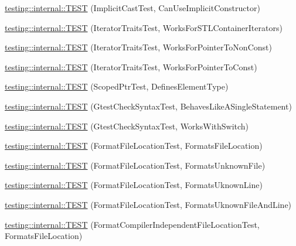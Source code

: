 \begin{DoxyCompactItemize}
\item 
\mbox{\hyperlink{namespacetesting_1_1internal_ad5c2cf37cc5aa78744012255cae78f9b}{testing\+::internal\+::\+T\+E\+ST}} (Implicit\+Cast\+Test, Can\+Use\+Implicit\+Constructor)
\item 
\mbox{\hyperlink{namespacetesting_1_1internal_abd56ca990c5b8c1aea44d15028a74f33}{testing\+::internal\+::\+T\+E\+ST}} (Iterator\+Traits\+Test, Works\+For\+S\+T\+L\+Container\+Iterators)
\item 
\mbox{\hyperlink{namespacetesting_1_1internal_a642234d85836450bb8795cf0a8a9f908}{testing\+::internal\+::\+T\+E\+ST}} (Iterator\+Traits\+Test, Works\+For\+Pointer\+To\+Non\+Const)
\item 
\mbox{\hyperlink{namespacetesting_1_1internal_afc0e95a0472d243967fd4720c681c478}{testing\+::internal\+::\+T\+E\+ST}} (Iterator\+Traits\+Test, Works\+For\+Pointer\+To\+Const)
\item 
\mbox{\hyperlink{namespacetesting_1_1internal_a99f56e2e9d5b30a879f877cc72bb0c0c}{testing\+::internal\+::\+T\+E\+ST}} (Scoped\+Ptr\+Test, Defines\+Element\+Type)
\item 
\mbox{\hyperlink{namespacetesting_1_1internal_a26d00130a017a66d0d60dc5a02a13d25}{testing\+::internal\+::\+T\+E\+ST}} (Gtest\+Check\+Syntax\+Test, Behaves\+Like\+A\+Single\+Statement)
\item 
\mbox{\hyperlink{namespacetesting_1_1internal_a4dfd147ff396984fca799878cb53dcea}{testing\+::internal\+::\+T\+E\+ST}} (Gtest\+Check\+Syntax\+Test, Works\+With\+Switch)
\item 
\mbox{\hyperlink{namespacetesting_1_1internal_a1a1c20d78e9e75b9c7f2b767eb62611b}{testing\+::internal\+::\+T\+E\+ST}} (Format\+File\+Location\+Test, Formats\+File\+Location)
\item 
\mbox{\hyperlink{namespacetesting_1_1internal_ace2f5407afdfb0767035d44b6758e4a0}{testing\+::internal\+::\+T\+E\+ST}} (Format\+File\+Location\+Test, Formats\+Unknown\+File)
\item 
\mbox{\hyperlink{namespacetesting_1_1internal_a17d1f472b6c1154de7b5b008b964ee32}{testing\+::internal\+::\+T\+E\+ST}} (Format\+File\+Location\+Test, Formats\+Uknown\+Line)
\item 
\mbox{\hyperlink{namespacetesting_1_1internal_a1195aaf7258c5442de7aebd95acefb9f}{testing\+::internal\+::\+T\+E\+ST}} (Format\+File\+Location\+Test, Formats\+Uknown\+File\+And\+Line)
\item 
\mbox{\hyperlink{namespacetesting_1_1internal_a9c12f8c1ebb19906e8fa0c430d139076}{testing\+::internal\+::\+T\+E\+ST}} (Format\+Compiler\+Independent\+File\+Location\+Test, Formats\+File\+Location)

\end{DoxyCompactItemize}
